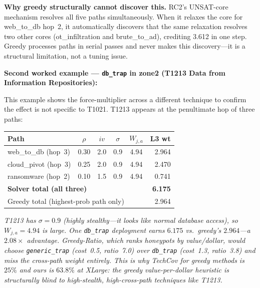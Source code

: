 \documentclass[journal]{IEEEtran}
\begin{document}
\begin{insightbox}
\textbf{Why greedy structurally cannot discover this.}
RC2's UNSAT-core mechanism resolves all five paths
simultaneously.
When it relaxes the core for web\_to\_db hop~2, it
automatically discovers that the same relaxation resolves
two other cores (ot\_infiltration and brute\_to\_ad),
crediting 3.612 in one step.
Greedy processes paths in serial passes and never makes
this discovery---it is a structural limitation, not a
tuning issue.
\end{insightbox}


\begin{examplebox}
\textbf{Second worked example --- \texttt{db\_trap} in zone2
(T1213 Data from Information Repositories):}

This example shows the force-multiplier across a different
technique to confirm the effect is not specific to T1021.
T1213 appears at the penultimate hop of three paths:
\begin{center}
\small\renewcommand{\arraystretch}{1.15}
\begin{tabular}{@{}lccccr@{}}
\toprule
\textbf{Path}&$\rho$&$iv$&$\sigma$&$W_{j,a}$&\textbf{L3 wt}\\
\midrule
web\_to\_db (hop~3)      &0.30&2.0&0.9&4.94&2.964\\
cloud\_pivot (hop~3)     &0.25&2.0&0.9&4.94&2.470\\
ransomware (hop~2)       &0.10&1.5&0.9&4.94&0.741\\
\midrule
\multicolumn{5}{l}{\textbf{Solver total (all three)}} &\textbf{6.175}\\
\multicolumn{5}{l}{Greedy total (highest-prob path only)}&2.964\\
\bottomrule
\end{tabular}
\end{center}

\textit{T1213 has $\sigma=0.9$ (highly stealthy---it looks
like normal database access), so $W_{j,a}=4.94$ is large.
One \texttt{db\_trap} deployment earns $6.175$ vs.\
greedy's $2.964$---a $\mathbf{2.08\times}$ advantage.
Greedy-Ratio, which ranks honeypots by value/dollar,
would choose \texttt{generic\_trap} (cost~0.5, ratio~7.0)
over \texttt{db\_trap} (cost~1.3, ratio~3.8) and miss
the cross-path weight entirely.
This is why TechCov for greedy methods is $25\%$ and
ours is $63.8\%$ at XLarge: the greedy value-per-dollar
heuristic is structurally blind to high-stealth,
high-cross-path techniques like T1213.}
\end{examplebox}
\end{document}
